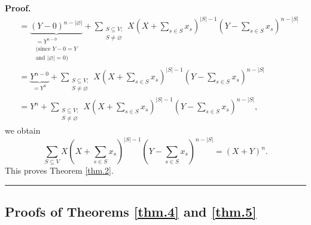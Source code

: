 \documentclass[numbers=enddot,12pt,final,onecolumn,notitlepage]{scrartcl}%
\theoremstyle{definition}
\newenvironment{proof}[1][Proof]{\noindent\textbf{#1.} }{\ \rule{0.5em}{0.5em}}
\let\sumnonlimits\sum
\renewcommand{\sum}{\sumnonlimits\limits}
\newenvironment{verlong}{}{}
\begin{document}
\begin{verlong}
\begin{proof}
\begin{align*}
&  =\underbrace{\left(  Y-0\right)  ^{n-\left\vert \varnothing\right\vert }%
}_{\substack{=Y^{n-0}\\\text{(since }Y-0=Y\\\text{and }\left\vert
\varnothing\right\vert =0\text{)}}}+\sum_{\substack{S\subseteq V;\\S\neq
\varnothing}}X\left(  X+\sum_{s\in S}x_{s}\right)  ^{\left\vert S\right\vert
-1}\left(  Y-\sum_{s\in S}x_{s}\right)  ^{n-\left\vert S\right\vert }\\
&  =\underbrace{Y^{n-0}}_{=Y^{n}}+\sum_{\substack{S\subseteq V;\\S\neq
\varnothing}}X\left(  X+\sum_{s\in S}x_{s}\right)  ^{\left\vert S\right\vert
-1}\left(  Y-\sum_{s\in S}x_{s}\right)  ^{n-\left\vert S\right\vert }\\
&  =Y^{n}+\sum_{\substack{S\subseteq V;\\S\neq\varnothing}}X\left(
X+\sum_{s\in S}x_{s}\right)  ^{\left\vert S\right\vert -1}\left(  Y-\sum_{s\in
S}x_{s}\right)  ^{n-\left\vert S\right\vert },
\end{align*}
we obtain%
\[
\sum_{S\subseteq V}X\left(  X+\sum_{s\in S}x_{s}\right)  ^{\left\vert
S\right\vert -1}\left(  Y-\sum_{s\in S}x_{s}\right)  ^{n-\left\vert
S\right\vert }=\left(  X+Y\right)  ^{n}.
\]
This proves Theorem \ref{thm.2}.
\end{proof}
\end{verlong}

\subsection{Proofs of Theorems \ref{thm.4} and \ref{thm.5}}
\end{document}
